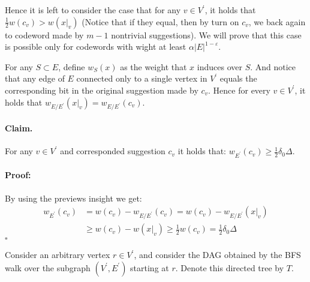 \documentclass{article}
\begin{document}
\begin{multicols*}{2}
  Hence it is left to consider the case that for any $v\in V^\prime$, it holds that $\frac{1}{2}w\left( c_{v}\right) >  w\left( x|_{v} \right)$ (Notice that if they equal, then by turn on $c_{v}$, we back again to codeword made by $m-1$ nontrivial suggestions). We will prove that this case is possible only for codewords with wight at least $\alpha|E|^{1-\varepsilon}$.

  For any $S \subset E$, define $w_{S}\left( x \right)$ as the weight that $x$ induces over $S$. And notice that any edge of $E$ connected only to a single vertex in $V^\prime$ equals the corresponding bit in the original suggestion made by $c_{v}$. Hence for every $v\in V^\prime$, it holds that $w_{E / E^\prime}\left(x|_{v}\right) = w_{E / E^\prime}\left(c_{v}\right)$. 

%
  \paragraph{Claim.} For any $v \in V^\prime$ and corresponded suggestion $c_{v}$ it holds that: $w_{E^\prime}\left( c_{v} \right) \ge \frac{1}{2}\delta_{0}\Delta$. 
  \paragraph{Proof:}By using the previews insight we get: \begin{equation*}
    \begin{split}
      w_{E^\prime}\left( c_{v} \right) &= w\left( c_{v} \right) - w_{E / E^\prime}\left( c_{v} \right) =  w\left( c_{v} \right) - w_{E / E^\prime}\left( x|_{v} \right) \\ 
      & \ge  w\left( c_{v} \right) - w\left( x|_{v} \right) \ge \frac{1}{2}w\left( c_{v} \right) = \frac{1}{2}\delta_{0}\Delta 
    \end{split}
  \end{equation*}
  $\square$

  Consider an arbitrary vertex $r \in V^\prime$, and consider the DAG obtained by the BFS walk over the subgraph $\left(V^\prime, E^\prime \right)$ starting at $r$. Denote this directed tree by $T$.



\end{multicols*}
\end{document}

